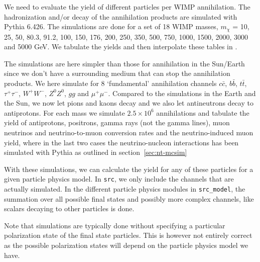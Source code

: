 We need to evaluate the yield of different particles per WIMP annihilation.
The hadronization and/or decay of the annihilation products are
simulated with {\sc Pythia} \cite{Sjostrand:2006za} 6.426.
The simulations are done for a set of 18 WIMP
masses, $m_{\chi}$ = 10, 25, 50, 80.3, 91.2, 100, 150, 176, 200, 250,
350, 500, 750, 1000, 1500, 2000, 3000 and 5000 GeV\@. We tabulate the
yields and then interpolate these tables in \ds.

     The simulations are here
     simpler than those for annihilation in the Sun/Earth
    since we don't have a surrounding medium that can stop the
     annihilation products.  We here simulate for 8 `fundamental'
     annihilation channels $c\bar{c}$, $b\bar{b}$,
     $t\bar{t}$, $\tau^+\tau^-$, $W^+W^-$, $Z^0 Z^{0}$, $g g$ and
     $\mu^{+} \mu^{-}$. Compared to the simulations in the Earth and
     the Sun, we now let pions and kaons decay and we also let
     antineutrons decay to antiprotons. For each mass we simulate
     $2.5 \times 10^{6}$ annihilations and tabulate the yield of
     antiprotons, positrons, gamma rays (not the gamma lines),
     muon neutrinos and neutrino-to-muon conversion rates and the
     neutrino-induced muon yield, where in the last two cases the
     neutrino-nucleon interactions has been simulated with {\sc
     Pythia} as outlined in section~\ref{sec:nt-mcsim}


With these simulations, we can calculate the yield for any of these
particles for a given particle physics model. In \texttt{src}, we only include the channels that are actually simulated. In the different particle physics modules in \texttt{src\_model}, the summation over all possible final states and possibly more complex channels, like scalars decaying to other particles is done.

Note that simulations are typically done without specifying a particular polarization state of the final state particles. This is however not entirely correct as the possible polarization states will depend on the particle physics model we have. 

